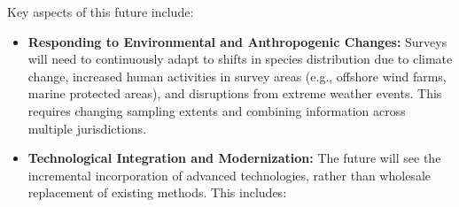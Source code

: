 \documentclass[
  letterpaper,
  oneside,
  open=any]{scrbook}
\providecommand{\tightlist}{%
  \setlength{\itemsep}{0pt}\setlength{\parskip}{0pt}}\usepackage{longtable,booktabs,array}
\begin{document}
Key aspects of this future include:

\begin{itemize}
\tightlist
\item
  \textbf{Responding to Environmental and Anthropogenic Changes:}
  Surveys will need to continuously adapt to shifts in species
  distribution due to climate change, increased human activities in
  survey areas (e.g., offshore wind farms, marine protected areas), and
  disruptions from extreme weather events. This requires changing
  sampling extents and combining information across multiple
  jurisdictions.
\item
  \textbf{Technological Integration and Modernization:} The future will
  see the incremental incorporation of advanced technologies, rather
  than wholesale replacement of existing methods. This includes:


\end{itemize}
\end{document}
